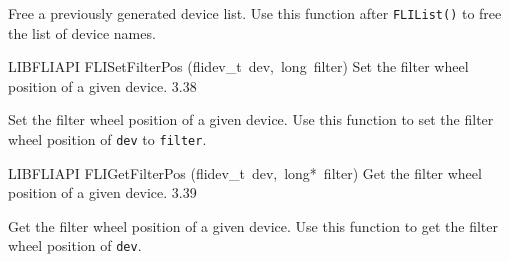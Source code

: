 \documentclass{article}
\begin{document}
\begin{cxxentry}
\begin{cxxfunction}
\begin{cxxdoc}
Free a previously generated device list.  Use this function after
\texttt{FLIList()} to free the list of device names.


\end{cxxdoc}
\end{cxxfunction}
\begin{cxxfunction}
{LIBFLIAPI}
        {FLISetFilterPos}
        {(flidev\_t\ dev,\ long\ filter)}
        { Set the filter wheel position of a given device.}
        {3.38}
\begin{cxxdoc}

Set the filter wheel position of a given device.  Use this function
to set the filter wheel position of \texttt{dev} to
\texttt{filter}.


\end{cxxdoc}
\end{cxxfunction}
\begin{cxxfunction}
{LIBFLIAPI}
        {FLIGetFilterPos}
        {(flidev\_t\ dev,\ long*\ filter)}
        { Get the filter wheel position of a given device.}
        {3.39}
\begin{cxxdoc}

Get the filter wheel position of a given device.  Use this function
to get the filter wheel position of \texttt{dev}.



\end{cxxdoc}
\end{cxxfunction}
\end{cxxentry}
\end{document}
